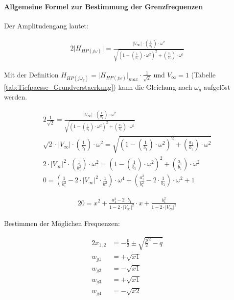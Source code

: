 \newpage

\noindent \textbf{Allgemeine Formel zur Bestimmung der Grenzfrequenzen}\\\\

\noindent Der Amplitudengang lautet:

\begin{alignat}{2}
\lvert H_{HP (j \omega)} \rvert = \frac{\lvert V_{\infty} \rvert \cdot \left(\frac{1}{b_{1}} \right) \cdot \omega^2}{\sqrt{\left(1 - \left(\frac{1}{b_{1}} \right) \cdot \omega^2 \right)^2 + \left(\frac{a_{1}}{b_{1}} \right) \cdot \omega^2}}
\end{alignat}

\noindent Mit der Definition $H_{HP (j \omega_{g})} = \lvert H_{HP (j \omega)} \rvert_{max} \cdot \frac{1}{\sqrt{2}}$ und $V_{\infty} = 1$ (Tabelle \ref{tab:Tiefpaesse_Grundverstaerkung}) kann die Gleichung nach $\omega_{g}$ aufgelöst werden.

\begin{alignat}{2}
\frac{1}{\sqrt{2}} = \frac{\lvert V_{\infty} \rvert \cdot \left(\frac{1}{b_{1}} \right) \cdot \omega^2}{\sqrt{\left(1 - \left(\frac{1}{b_{1}} \right) \cdot \omega^2 \right)^2 + \left(\frac{a_{1}}{b_{1}} \right) \cdot \omega^2}}\\
\sqrt{2} \cdot \lvert V_{\infty} \rvert \cdot \left(\frac{1}{b_{1}} \right) \cdot \omega^2 = \sqrt{\left(1 - \left(\frac{1}{b_{1}} \right) \cdot \omega^2 \right)^2 + \left(\frac{a_{1}}{b_{1}} \right) \cdot \omega^2}\\
2 \cdot \lvert V_{\infty} \rvert^2 \cdot \left(\frac{1}{b_{1}^2} \right) \cdot \omega^2 = \left(1 - \left(\frac{1}{b_{1}} \right) \cdot \omega^2 \right)^2 + \left(\frac{a_{1}}{b_{1}} \right) \cdot \omega^2\\
0 = \left( \frac{1}{b_{1}^2} - 2 \cdot \lvert V_{\infty} \rvert^2 \cdot \frac{1}{b_{1}^2} \right) \cdot \omega^4 + \left(\frac{a_{1}^2}{b_{1}^2} - 2 \cdot \frac{1}{b_{1}} \right) \cdot \omega^2 + 1
\end{alignat}




\begin{alignat}{2}
0 = x^2 + \frac{a_{1}^2 - 2 \cdot b_{1}}{1 - 2 \cdot \lvert V_{\infty} \rvert^2} \cdot x + \frac{b_{1}^2}{1 - 2 \cdot \lvert V_{\infty} \rvert^2}
\end{alignat}

\noindent Bestimmen der Möglichen Frequenzen:

\begin{alignat}{2}
x_{1,2} &= -\frac{p}{2} \pm \sqrt{\frac{p}{2}^2 - q}\\
w_{g1} &= +\sqrt{x1}\\
w_{g2} &= -\sqrt{x1}\\
w_{g3} &= +\sqrt{x1}\\
w_{g4} &= -\sqrt{x2}
\end{alignat}


